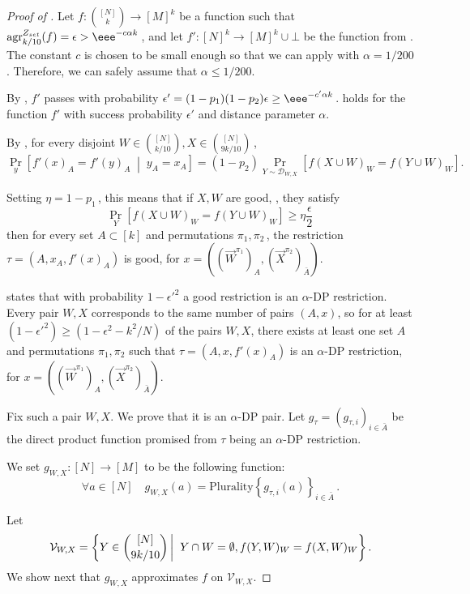 \documentclass{toc}
\newcommand{\Prob}[2][]{\Pr_{{#1}}\left[#2\right]} %
\newcommand{\given}{\;\middle\vert\;} %
\newcommand\sett[2]{\left\{ #1 \left| \; \vphantom{#1 #2} \right. #2  \right\}} %
\newcommand{\Set}[1]{\left\{#1\right\}} %
\newcommand\f{f} %
\newcommand\setf{f} %
\newcommand{\g}{g} %
\newcommand{\test}[2]{
	\ifx &#2&
	\textrm{agr}^{#1}
	\else	
	\textrm{agr}^{#1}_{#2}
	\fi}
\newcommand{\sets}{\binom{[N]}{k}} %
\newcommand\rest[1]{{\bar{#1}}}  %
\begin{document}
\begin{proof}[Proof of ]
	Let  $\setf:\sets\rightarrow[M]^k$ be a function such that $\test{Z_{set}}{k/10}(\setf)=\epsilon > \eee^{-c\alpha k}$\,, and let $\f':[N]^k\rightarrow[M]^k\cup\bot$ be the function from .
	The constant $c$ is chosen to be small enough so that we can apply  with $\alpha = 1/200$. Therefore, we can safely assume that $\alpha \leq 1/200$.
	
	By , $\f'$ passes  with probability $\epsilon'=(1-p_1)(1-p_2)\epsilon\geq \eee^{-c'\alpha k}$\,.  holds for the function $\f'$ with success probability $\epsilon'$ and distance parameter $\alpha$.
	
	By , for every disjoint $W\in\binom{[N]}{k/10},X\in\binom{[N]}{9k/10} $\,,
	\[ \Prob[y]{\f'(x)_A = \f'(y)_A \given y_A=x_A} =(1-p_2)\Prob[Y\sim\mathcal{D}_{W,X}]{\setf(X\cup W)_W = \setf(Y\cup W)_W}. \]
	
	
	Setting $\eta=1-p_1$\,, this means that if $X,W$ are good, \ie, 
%
they satisfy  %
%
\[\Prob[Y]{\setf(X\cup W)_W = \setf(Y\cup W)_W}\geq\eta\frac{\epsilon}{2}\,\]   %
then for every set $A\subset[k]$ and permutations $\pi_1,\pi_2$\,, the restriction $\tau = (A,x_A,\f'(x)_A)$ is good, for $x=((\vec W^{\pi_1})_A,(\vec X^{\pi_2})_{\rest A})$.
	
 states that with probability $1-\epsilon'^2$ a good restriction is an $\alpha$-DP restriction.  Every
%
pair $W,X$ corresponds  %
to the same number of
pairs   %
$(A,x)$, so for at least 
	$(1-\epsilon'^2) \geq (1-\epsilon^2 - k^2/N)$ %
of the %
pairs  %
$W,X$, there exists at least one set $A$ and permutations $\pi_1,\pi_2$ such that $\tau = (A,x,\f'(x)_A)$ is an $\alpha$-DP restriction, for $x=((\vec W^{\pi_1})_A,(\vec X^{\pi_2})_{\rest A})$.
	
	Fix such a pair $W,X$. We prove that it is an $\alpha$-DP pair. 
	Let $\g_\tau = (\g_{\tau,i})_{i\in\rest{A}}$ be the direct product function promised from $\tau$ being an $\alpha$-DP restriction.

	We set $\g_{W,X}:[N]\rightarrow[M]$ to be the following function: 
	\[  \forall a\in [N] \quad \g_{W,X}(a) = \textrm{Plurality}\Set{\g_{\tau,i}(a)}_{i\in\rest{A}}\,. \]
	
	Let 
	\[ \mathcal{V}_{W,X}= \sett{Y\in\binom{[N]}{9k/10}}{Y\cap W=\emptyset, \setf(Y,W)_W=\setf(X,W)_W}.\]
We show next that $\g_{W,X}$ approximates $\setf$ on $\mathcal{V}_{W,X}$. 
	

\end{proof}
\end{document}
